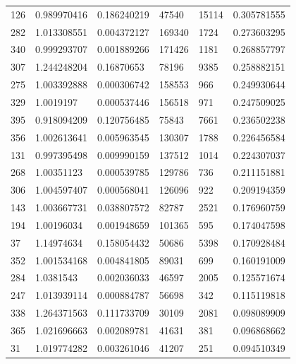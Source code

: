 \documentclass[withoutpreface,bwprint]{cumcmthesis}
\begin{document}
\begin{description}
\begin{longtable}{l|llll|l}
            126  & 0.989970416  & 0.186240219  & 47540    & 15114          & 0.305781555    \\
            282  & 1.013308551  & 0.004372127  & 169340   & 1724           & 0.273603295    \\
            340  & 0.999293707  & 0.001889266  & 171426   & 1181           & 0.268857797    \\
            307  & 1.244248204  & 0.16870653   & 78196    & 9385           & 0.258882151    \\
            275  & 1.003392888  & 0.000306742  & 158553   & 966            & 0.249930644    \\
            329  & 1.0019197    & 0.000537446  & 156518   & 971            & 0.247509025    \\
            395  & 0.918094209  & 0.120756485  & 75843    & 7661           & 0.236502238    \\
            356  & 1.002613641  & 0.005963545  & 130307   & 1788           & 0.226456584    \\
            131  & 0.997395498  & 0.009990159  & 137512   & 1014           & 0.224307037    \\
            268  & 1.00351123   & 0.000539785  & 129786   & 736            & 0.211151881    \\
            306  & 1.004597407  & 0.000568041  & 126096   & 922            & 0.209194359    \\
            143  & 1.003667731  & 0.038807572  & 82787    & 2521           & 0.176960759    \\
            194  & 1.00196034   & 0.001948659  & 101365   & 595            & 0.174047598    \\
            37   & 1.14974634   & 0.158054432  & 50686    & 5398           & 0.170928484    \\
            352  & 1.001534168  & 0.004841805  & 89031    & 699            & 0.160191009    \\
            284  & 1.0381543    & 0.002036033  & 46597    & 2005           & 0.125571674    \\
            247  & 1.013939114  & 0.000884787  & 56698    & 342            & 0.115119818    \\
            338  & 1.264371563  & 0.111733709  & 30109    & 2081           & 0.098089909    \\
            365  & 1.021696663  & 0.002089781  & 41631    & 381            & 0.096868662    \\
            31   & 1.019774282  & 0.003261046  & 41207    & 251            & 0.094510349    \\

\end{longtable}
\end{description}
\end{document}
